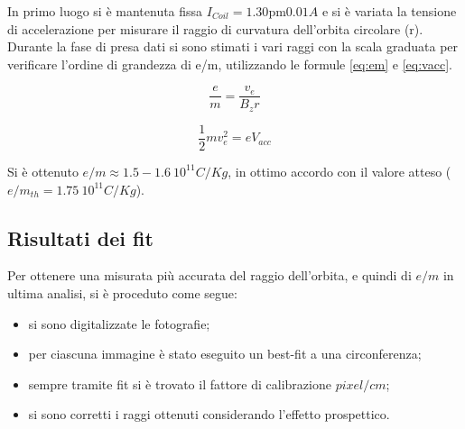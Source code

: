 \documentclass[10pt,a4paper]{article}
\begin{document}
In primo luogo si è mantenuta fissa $I_{Coil} = \unit{1.30 \pm 0.01}{A}$ e si è variata la tensione di accelerazione per misurare il raggio di curvatura dell'orbita circolare (r). Durante la fase di presa dati si sono stimati i vari raggi con la scala graduata per verificare l'ordine di grandezza di e/m, utilizzando le formule \eqref{eq:em} e \eqref{eq:vacc}. 

\begin{equation}
	\frac{e}{m} = \frac{v_e}{B_z r}
	\label{eq:em}
\end{equation}

\begin{equation}
\frac{1}{2} m v_e^2 = e V_{acc}
\label{eq:vacc}
\end{equation}

Si è ottenuto  $e/m \approx \unit{1.5-1.6~10^{11}}{C/Kg}$, in ottimo accordo con il valore atteso ($e/m_{th} = \unit{1.75~10^{11}}{C/Kg}$).

\subsection{Risultati dei fit}

Per ottenere una misurata più accurata del raggio dell'orbita, e quindi di $e/m$ in ultima analisi, si è proceduto come segue:
\begin{itemize}
	\item si sono digitalizzate le fotografie;
	\item per ciascuna immagine è stato eseguito un best-fit a una circonferenza;
	\item sempre tramite fit si è trovato il fattore di calibrazione $pixel/cm$;
	\item si sono corretti i raggi ottenuti considerando l'effetto prospettico.
\end{itemize}
\end{document}
